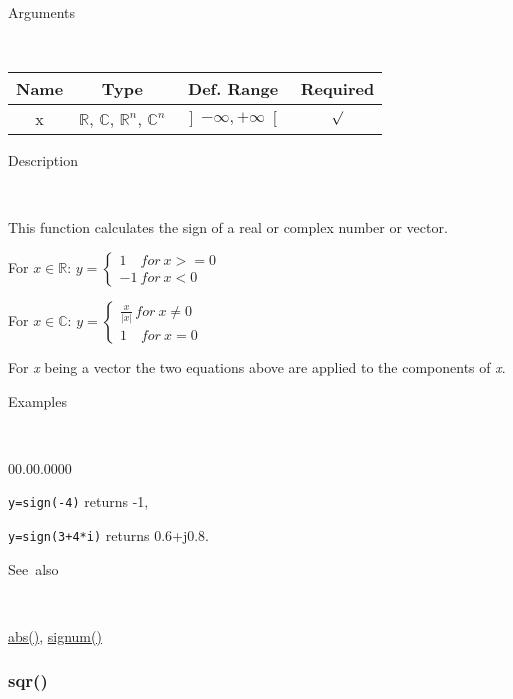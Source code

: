 \begin{description}
\item [Arguments]~
\end{description}
\begin{tabular}{|c|c|c|c|}
\hline 
Name&
Type&
Def. Range&
Required\tabularnewline
\hline
\hline 
x&
$\mathbb{R}$, $\mathbb{C}$, $\mathbb{R}^{n}$, $\mathbb{C}^{n}$&
$\left]-\infty,+\infty\right[$&
$\surd$\tabularnewline
\hline
\end{tabular}

\begin{description}
\item [Description]~
\end{description}
This function calculates the sign of a real or complex number or vector.

\medskip{}
For $x\in\mathbb{R}$: $y=\left\{ \begin{array}{l}
1\quad for\: x>=0\\
-1\: for\: x<0\end{array}\right.$ 
\medskip{}

For $x\in\mathbb{C}$: $y=\left\{ \begin{array}{l}
{\displaystyle \frac{x}{\left|x\right|}}\, for\: x\neq0\\
1\quad for\: x=0\end{array}\right.$
\medskip{}

For \textit{x} being a vector the two equations above are
applied to the components of \textit{x}.

\begin{description}
\item [Examples]~
\end{description}
\begin{lyxlist}{00.00.0000}
\item [\texttt{y=sign(-4)}]returns -1,
\item [\texttt{y=sign(3+4{*}i)}]returns 0.6+j0.8.
\end{lyxlist}
\begin{description}
\item [See~also]~
\end{description}
\textcolor{blue}{\hyperlink{abs}{abs()}}, \textcolor{blue}{\hyperlink{signum}{signum()}}


\newpage
\subsubsection*{\hypertarget{sqr}{}{\Large sqr()}}


